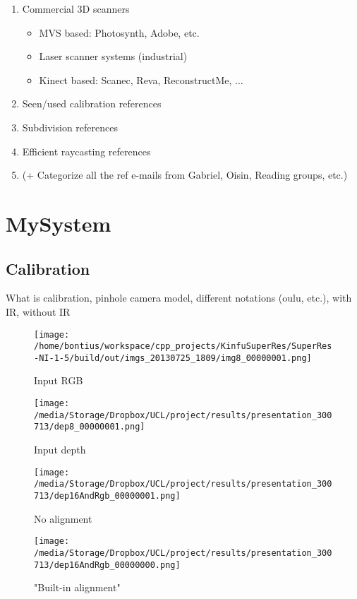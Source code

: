 \documentclass{ucl_thesis}
\begin{document}
\begin{enumerate}
		\item Commercial 3D scanners
		\begin{itemize}
			\item MVS based: Photosynth, Adobe, etc.
			\item Laser scanner systems (industrial)
			\item Kinect based: Scanec, Reva, ReconstructMe, ...
		\end{itemize}
		
		\item Seen/used calibration references
		\item Subdivision references
		\item Efficient raycasting references
		\item (+ Categorize all the ref e-mails from Gabriel, Oisin, Reading groups, etc.)
	
	\end{enumerate}

\chapter{MySystem} 
\label{chp:my_system}

\section{Calibration}

What is calibration, pinhole camera model, different notations (oulu, etc.), 
with IR, without IR

\begin{figure}[h!]\centering
    \begin{minipage}[b]{0.49\linewidth}
        \texttt{[image: /home/bontius/workspace/cpp\_projects/KinfuSuperRes/SuperRes-NI-1-5/build/out/imgs\_20130725\_1809/img8\_00000001.png]}
        \caption{Input RGB}
    \end{minipage}
    \begin{minipage}[b]{0.49\linewidth}
        \texttt{[image: /media/Storage/Dropbox/UCL/project/results/presentation\_300713/dep8\_00000001.png]}
		\caption{Input depth}
    \end{minipage}
\end{figure}

\begin{figure}[h!]\centering
	\begin{minipage}[b]{0.49\linewidth}
		\texttt{[image: /media/Storage/Dropbox/UCL/project/results/presentation\_300713/dep16AndRgb\_00000001.png]}
		\caption{No alignment}
	\end{minipage}
	\begin{minipage}[b]{0.49\linewidth}
		\texttt{[image: /media/Storage/Dropbox/UCL/project/results/presentation\_300713/dep16AndRgb\_00000000.png]}
		\caption{"Built-in alignment"}
	\end{minipage}
\end{figure}
\end{document}

